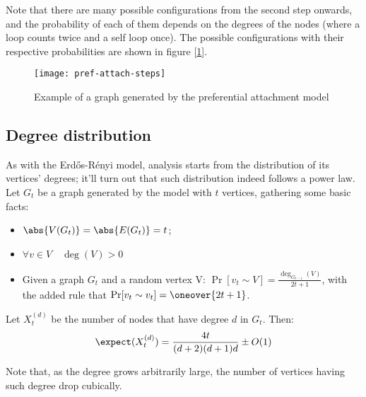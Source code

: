 Note that there are many possible configurations from the second step onwards, and the probability of each of them depends on the degrees of the nodes (where a loop counts twice and a self loop once). The possible configurations with their respective probabilities are shown in figure [\ref{fig:pref-att-steps}].

\begin{figure}[ht]
    \centering
    \texttt{[image: pref-attach-steps]}
    \caption{Example of a graph generated by the preferential attachment model}
    \label{fig:pref-att-steps}
\end{figure}


\subsection{Degree distribution}\label{sec:pref-attach-degree}

As with the Erd\H{o}s-Rényi model, analysis starts from the distribution of its vertices' degrees; it'll turn out that such distribution indeed follows a power law. Let $G_t$ be a graph generated by the model with $t$ vertices, gathering some basic facts:
       
\begin{itemize}
    \item $\abs{V(G_t)} = \abs{E(G_t)} = t$;
    \item $\forall v \in V \quad \deg(V) > 0$
    \item Given a graph $G_t$ and a random vertex V: $\Pr[v_t \sim V] = \frac{\deg_{G_{t - 1}}(V)}{2t + 1}$, with the added rule that $\Pr[v_t \sim v_t] = \oneover{2t + 1}$.
\end{itemize}
    
\begin{thm}\label{thm:pref-attach-degree}
    Let $X_t^{(d)}$ be the number of nodes that have degree $d$ in $G_t$. Then:
    \[
        \expect(X_t^{(d)}) = \frac{4 t}{(d + 2)(d + 1)d} \pm O(1)
    \]
\end{thm}

\begin{obs}
    Note that, as the degree grows arbitrarily large, the number of vertices having such degree drop cubically.
\end{obs}
    
